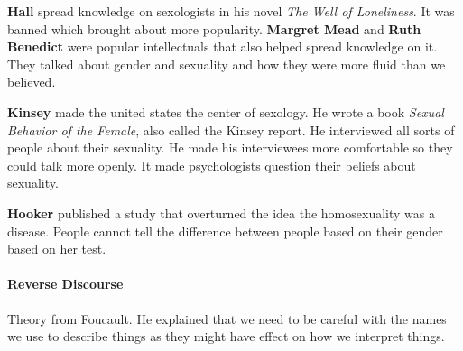 \documentclass{article}
\begin{document}
\textbf{Hall} spread knowledge on sexologists in his novel \emph{The Well of Loneliness}. It was banned which brought about more popularity. \textbf{Margret Mead} and \textbf{Ruth Benedict} were popular intellectuals that also helped spread knowledge on it. They talked about gender and sexuality and how they were more fluid than we believed.

\textbf{Kinsey} made the united states the center of sexology. He wrote a book \emph{Sexual Behavior of the Female}, also called the Kinsey report. He interviewed all sorts of people about their sexuality. He made his interviewees more comfortable so they could talk more openly. It made psychologists question their beliefs about sexuality.

\textbf{Hooker} published a study that overturned the idea the homosexuality was a disease. People cannot tell the difference between people based on their gender based on her test.

\paragraph{Reverse Discourse}
\label{par:reverse_discourse}
Theory from Foucault. He explained that we need to be careful with the names we use to describe things as they might have effect on how we interpret things.
\end{document}
